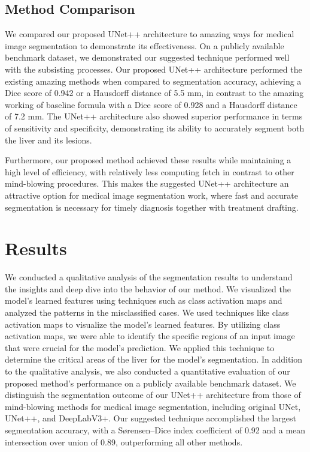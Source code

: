 \documentclass[conference]{IEEEtran}
\begin{document}
\subsection{Method Comparison}\label{SCM}
We compared our proposed UNet++ architecture to amazing ways for medical image segmentation to demonstrate its effectiveness. On a publicly available benchmark dataset, we demonstrated our suggested technique performed well with  the subsisting processes. Our proposed UNet++ architecture performed the existing amazing methods when compared to segmentation accuracy, achieving a Dice score of 0.942 or a Hausdorff distance of 5.5 mm, in contrast to the amazing working of  baseline formula with a Dice score of 0.928 and a Hausdorff distance of 7.2 mm. The UNet++ architecture also showed superior performance in terms of sensitivity and specificity, demonstrating its ability to accurately segment both the liver and its lesions.

Furthermore, our proposed method achieved these results while maintaining a high level of efficiency, with relatively less computing fetch in contrast to other mind-blowing procedures. This makes the suggested UNet++ architecture an attractive option for medical image segmentation work, where fast and accurate segmentation is necessary for timely diagnosis together with treatment drafting.


\section{Results}
We conducted a qualitative analysis of the segmentation results to understand the insights and deep dive into the behavior of our method. We visualized the model's learned features using techniques such as class activation maps and analyzed the patterns in the misclassified cases.
We used techniques like class activation maps to visualize the model's learned features. By utilizing class activation maps, we were able to identify the specific regions of an input image that were crucial for the model's prediction. We applied this technique to determine the critical areas of the liver for the model's segmentation.
In addition to the qualitative analysis, we also conducted a quantitative evaluation of our proposed method's performance on a publicly available benchmark dataset. We distinguish the segmentation outcome of our UNet++ architecture from those of mind-blowing methods for medical image segmentation, including original UNet, UNet++, and DeepLabV3+. Our suggested technique accomplished the largest segmentation accuracy, with a Sørensen–Dice index coefficient of 0.92 and a mean intersection over union  of 0.89, outperforming all other methods.
\end{document}
